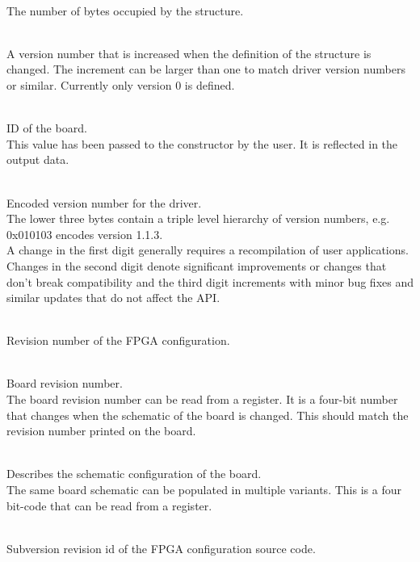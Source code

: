 			\\
			The number of bytes occupied by the structure.

			\\
			A version number that is increased when the definition of the structure is changed. The increment can be larger than one to match driver version numbers or similar. Currently only version 0 is defined.\par


			\\
			ID of the board.\\
			This value has been passed to the constructor by the user. It is reflected in the output data.\par

			\\
			Encoded version number for the driver.\\
			The lower three bytes contain a triple level hierarchy of version numbers, e.g. 0x010103 encodes version 1.1.3.\\
			A change in the first digit generally requires a recompilation of user applications. 
			Changes in the second digit denote significant improvements or changes that don't break compatibility 
			and the third digit increments with minor bug fixes and similar updates that do not affect the API.\par

			\\
			Revision number of the FPGA configuration.

			\\
			Board revision number.\\
			The board revision number can be read from a register. It is a four-bit number that changes when the schematic of the board is changed. This should match the revision number printed on the board.

			\\
			Describes the schematic configuration of the board.\\
			The same board schematic can be populated in multiple variants. This is a four bit-code that can be read from a register.

			\\
			Subversion revision id of the FPGA configuration source code.

